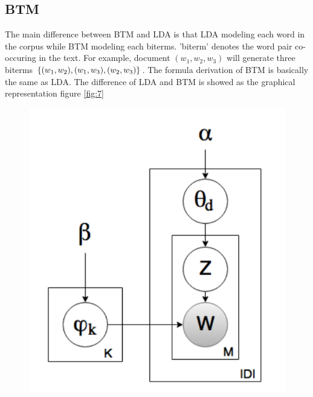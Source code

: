 
\subsection{BTM}
The main difference between BTM and LDA is that LDA modeling each word in the corpus while BTM modeling each biterms. 'biterm' denotes the word pair co-occuring in the text\cite{cheng2014btm}. For example, document $(w_1, w_2, w_3)$ will generate three biterms $\{(w_1,w_2), (w_1,w_3), \\(w_2,w_3)\}$. The formula derivation of BTM is basically the same as LDA. The difference of LDA and BTM is showed as the graphical representation figure \ref{fig:7}

\begin{figure}[H]
    \begin{minipage}[t]{0.5\linewidth}
        \centering
        \includegraphics[scale=0.5]{images/LDA.png}
    \end{minipage}%
    \begin{minipage}[t]{0.5\linewidth}
        \centering

\end{minipage}
\end{figure}
